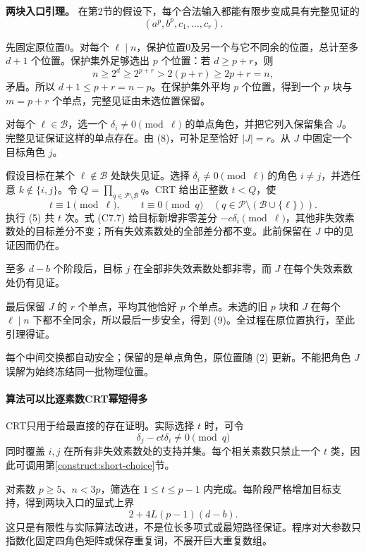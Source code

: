 \documentclass[11pt,a4paper]{article}
\theoremstyle{definition}
\numberwithin{equation}{section}
\begin{document}
\textbf{{两块入口引理。}} {在第2节的假设下，每个合法输入都能有限步变成具有完整见证的} \[
(a^p,b^p,c_1,\ldots,c_r).
\tag{C7.9}
\]

{先固定原位置0。对每个} \(\ell\mid n\){，保护位置0及另一个与它不同余的位置，总计至多} \(d+1\) {个位置。保护集外足够选出} \(p\) {个位置：若} \(d\ge p+r\){，则} \[
n\ge2^d\ge2^{p+r}>2(p+r)\ge2p+r=n,
\] {矛盾。所以} \(d+1\le p+r=n-p\){。在保护集外平均} \(p\) {个位置，得到一个} \(p\) {块与} \(m=p+r\) {个单点，完整见证由未选位置保留。}

{对每个} \(\ell\in\mathcal B\){，选一个} \(\delta_i\ne0\pmod\ell\) {的单点角色，并把它列入保留集合} \(J\){。完整见证保证这样的单点存在。由} {(8)，可补足至恰好} \(|J|=r\){。从} \(J\) {中固定一个目标角色} \(j\){。}

{假设目标在某个} \(\ell\notin\mathcal B\) {处缺失见证。选择} \(\delta_i\ne0\pmod\ell\) {的角色} \(i\ne j\){，并选任意} \(k\notin\{i,j\}\){。令} \(Q=\prod_{q\in\mathcal P\setminus\mathcal B}q\){。CRT} {给出正整数} \(t<Q\){，使} \[
t\equiv1\pmod\ell,\qquad
t\equiv0\pmod q\quad(q\in\mathcal P\setminus(\mathcal B\cup\{\ell\})).
\] {执行} {(5)} {共} \(t\) {次。式} {(C7.7)} {给目标新增非零差分} \(-c\delta_i\pmod\ell\){，其他非失效素数处的目标差分不变；所有失效素数处的全部差分都不变。此前保留在} \(J\) {中的见证因而仍在。}

{至多} \(d-b\) {个阶段后，目标} \(j\) {在全部非失效素数处都非零，而} \(J\) {在每个失效素数处仍有见证。}

{最后保留} \(J\) {的} \(r\) {个单点，平均其他恰好} \(p\) {个单点。未选的旧} \(p\) {块和} \(J\) {在每个} \(\ell\mid n\) {下都不全同余，所以最后一步安全，得到} {(9)。全过程在原位置执行，至此引理得证。}

{每个中间交换都自动安全；保留的是单点角色，原位置随} {(2)} {更新。不能把角色} \(J\) {误解为始终冻结同一批物理位置。}

\paragraph*{\texorpdfstring{{算法可以比逐素数CRT幂短得多}}{算法可以比逐素数CRT幂短得多}}\label{C7-h44}

{CRT只用于给最直接的存在证明。实际选择} \(t\) {时，可令} \[
\delta_j-ct\delta_i\ne0\pmod q
\] {同时覆盖} \(i,j\) {在所有非失效素数处的支持并集。每个相关素数只禁止一个} \(t\) {类，因此可调用}第\ref{construct:short-choice}节{。}

{对素数} \(p\ge5\){、}\(n<3p\){，筛选在} \(1\le t\le p-1\) {内完成。每阶段严格增加目标支持，得到两块入口的显式上界} \[
2+4L(p-1)(d-b).\tag{C7.10}
\] {这只是有限性与实际算法改进，不是位长多项式或最短路径保证。程序对大参数只指数化固定四角色矩阵或保存重复词，不展开巨大重复数组。}
\end{document}
